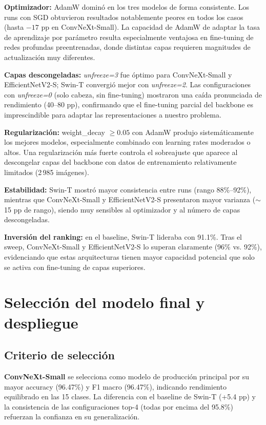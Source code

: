 \documentclass[11pt,a4paper]{article}
\begin{document}
\textbf{Optimizador:} AdamW dominó en los tres modelos de forma consistente. Los runs con SGD obtuvieron resultados notablemente peores en todos los casos (hasta $-17$ pp en ConvNeXt-Small). La capacidad de AdamW de adaptar la tasa de aprendizaje por parámetro resulta especialmente ventajosa en fine-tuning de redes profundas preentrenadas, donde distintas capas requieren magnitudes de actualización muy diferentes.

\textbf{Capas descongeladas:} \textit{unfreeze=3} fue óptimo para ConvNeXt-Small y EfficientNetV2-S; Swin-T convergió mejor con \textit{unfreeze=2}. Las configuraciones con \textit{unfreeze=0} (solo cabeza, sin fine-tuning) mostraron una caída pronunciada de rendimiento (40--80 pp), confirmando que el fine-tuning parcial del backbone es imprescindible para adaptar las representaciones a nuestro problema.

\textbf{Regularización:} weight\_decay $\geq 0.05$ con AdamW produjo sistemáticamente los mejores modelos, especialmente combinado con learning rates moderados o altos. Una regularización más fuerte controla el sobreajuste que aparece al descongelar capas del backbone con datos de entrenamiento relativamente limitados (2\,985 imágenes).

\textbf{Estabilidad:} Swin-T mostró mayor consistencia entre runs (rango 88\%--92\%), mientras que ConvNeXt-Small y EfficientNetV2-S presentaron mayor varianza ($\sim$15 pp de rango), siendo muy sensibles al optimizador y al número de capas descongeladas.

\textbf{Inversión del ranking:} en el baseline, Swin-T lideraba con 91.1\%. Tras el sweep, ConvNeXt-Small y EfficientNetV2-S lo superan claramente (96\% vs. 92\%), evidenciando que estas arquitecturas tienen mayor capacidad potencial que solo se activa con fine-tuning de capas superiores.

\section{Selección del modelo final y despliegue}

\subsection{Criterio de selección}

\textbf{ConvNeXt-Small} se selecciona como modelo de producción principal por su mayor accuracy (96.47\%) y F1 macro (96.47\%), indicando rendimiento equilibrado en las 15 clases. La diferencia con el baseline de Swin-T (+5.4 pp) y la consistencia de las configuraciones top-4 (todas por encima del 95.8\%) refuerzan la confianza en su generalización.
\end{document}
